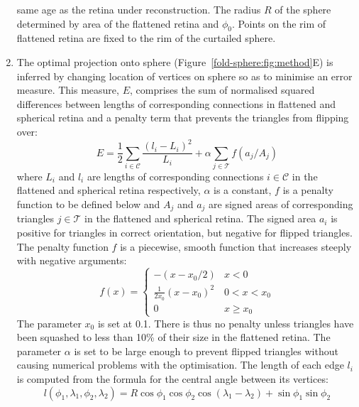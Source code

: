 \documentclass[10pt]{article}
\begin{document}
\begin{enumerate}
 same age as the retina under reconstruction. The radius $R$ of the
  sphere determined by area of the flattened retina and $\phi_0$.
  Points on the rim of flattened retina are fixed to the rim of the
  curtailed sphere. 
\item The optimal projection onto sphere
  (Figure~\ref{fold-sphere:fig:method}E) is inferred by changing
  location of vertices on sphere so as to minimise an error
  measure. This measure, $E$, comprises the sum of normalised squared
  differences between lengths of corresponding connections in
  flattened and spherical retina and a penalty term that prevents the
  triangles from flipping over:
  \begin{equation}
    E = \frac{1}{2} \sum_{i\in\mathcal{C}} \frac{(l_i - L_i)^2}{L_i}  
    + \alpha\sum_{j\in\mathcal{T}} f(a_j/A_j)
  \end{equation}
  where $L_i$ and $l_i$ are lengths of corresponding connections
  $i\in\mathcal{C}$ in the flattened and spherical retina
  respectively, $\alpha$ is a constant, $f$ is a penalty function to
  be defined below and $A_j$ and $a_j$ are signed areas of
  corresponding triangles $j\in\mathcal{T}$ in the flattened and
  spherical retina.  The signed area $a_i$ is positive for triangles in
  correct orientation, but negative for flipped triangles. The penalty
  function $f$ is a piecewise, smooth function that increases steeply
  with negative arguments:
  \begin{equation}
    \label{retistruct_plos:eq:1}
    f(x) = \left\{
        \begin{array}{ll}
          -(x - x_0/2) & x < 0 \\
          \frac{1}{2x_0}(x - x_0)^2 & 0 < x <x_0 \\
          0 & x \ge x_0
          \end{array} \right.
  \end{equation}
  The parameter $x_0$ is set at 0.1. There is thus no penalty unless
  triangles have been squashed to less than 10\% of their size in the
  flattened retina.  The parameter $\alpha$ is set to be large enough
  to prevent flipped triangles without causing numerical problems with
  the optimisation. The length of each edge $l_i$ is computed from the
  formula for the central angle between its vertices:
  \begin{equation}
    \label{retistruct_plos:eq:2}
    l(\phi_1, \lambda_1, \phi_2, \lambda_2) =
    R\cos\phi_1\cos\phi_2\cos(\lambda_1-\lambda_2) +
    \sin\phi_1\sin\phi_2   
  \end{equation}

\end{enumerate}
\end{document}
